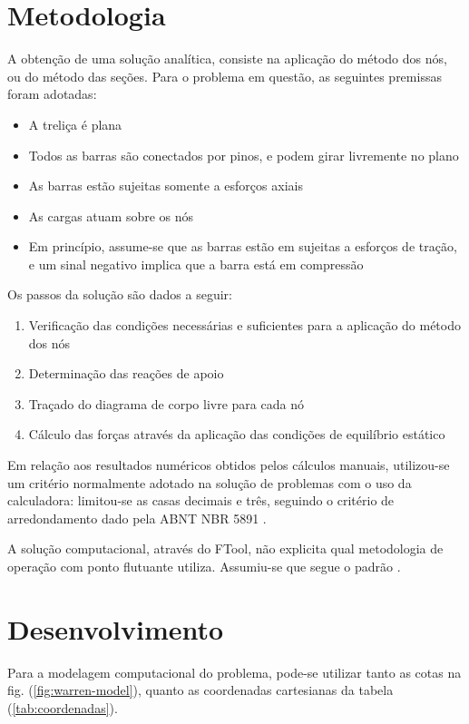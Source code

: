 \documentclass[a4paper, 12pt]{article} %
\begin{document}
\section{Metodologia}\label{sec:metodologia}
A obtenção de uma solução analítica, consiste na aplicação do método dos nós, ou do método das seções. Para o problema em questão, as seguintes premissas foram adotadas:
\begin{itemize}
    \item A treliça é plana
    \item Todos as barras são conectados por pinos, e podem girar livremente no plano
    \item As barras estão sujeitas somente a esforços axiais
    \item As cargas atuam sobre os nós
    \item Em princípio, assume-se que as barras estão em sujeitas a esforços de tração, e um sinal negativo implica que a barra está em compressão
\end{itemize}
    
Os passos da solução são dados a seguir:
\begin{enumerate}
\item Verificação das condições necessárias e suficientes para a aplicação do método dos nós
\item Determinação das reações de apoio
\item Traçado do diagrama de corpo livre para cada nó
\item Cálculo das forças através da aplicação das condições de equilíbrio estático
\end{enumerate}

Em relação aos resultados numéricos obtidos pelos cálculos manuais, utilizou-se um critério normalmente adotado na solução de problemas com o uso da calculadora: limitou-se as casas decimais e três, seguindo o critério de arredondamento dado pela ABNT NBR 5891 \cite{nbr5891}. 

A solução computacional, através do FTool, não explicita qual metodologia de operação com ponto flutuante utiliza. Assumiu-se que segue o padrão \cite{1985--ieee754}.

\section{Desenvolvimento}

Para a modelagem computacional do problema, pode-se utilizar tanto as cotas na fig. (\ref{fig:warren-model}), quanto as coordenadas cartesianas da tabela (\ref{tab:coordenadas}).
\end{document}
